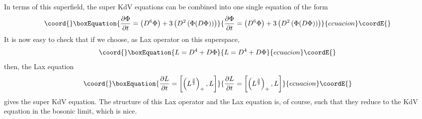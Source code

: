\documentclass[a4paper,11pt]{article}
\begin{document}
In terms of this superfield, the super KdV equations can be combined
into one single equation of the form
\begin{equation}\coord{}\boxEquation{
{\partial \Phi\over \partial t} = \left(D^{6}\Phi\right) + 3
\left(D^{2}\left(\Phi (D\Phi)\right)\right)
}{
{\partial \Phi\over \partial t} = \left(D^{6}\Phi\right) + 3
\left(D^{2}\left(\Phi (D\Phi)\right)\right)
}{ecuacion}\coordE{}\end{equation}
It is now easy to check that if we choose, as Lax operator on this
superspace,
\begin{equation}\coord{}\boxEquation{
L = D^{4} + D \Phi
}{
L = D^{4} + D \Phi
}{ecuacion}\coordE{}\end{equation}
then, the Lax equation
\begin{equation}\coord{}\boxEquation{
{\partial L\over \partial t} = \left[ \left(L^{3\over 2}\right)_{+} ,
L\right]
}{
{\partial L\over \partial t} = \left[ \left(L^{3\over 2}\right)_{+} ,
L\right]
}{ecuacion}\coordE{}\end{equation}
gives the super KdV equation. The structure of this Lax operator and
the Lax equation is, of course, such that they reduce to the KdV
equation in the bosonic limit, which is nice.
\end{document}
